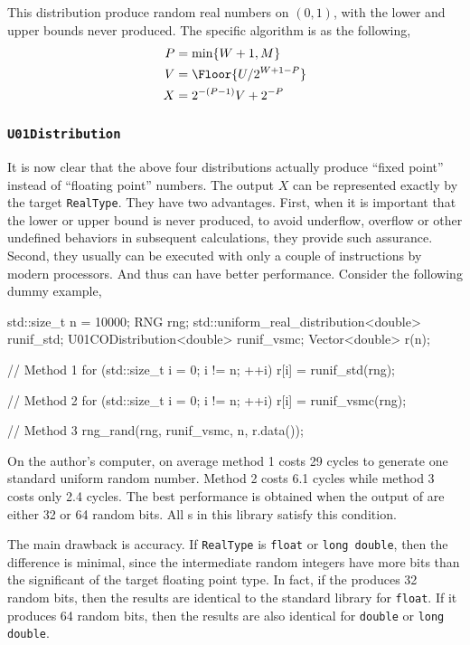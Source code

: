 This distribution produce random real numbers on $(0, 1)$, with the lower and
upper bounds never produced. The specific algorithm is as the following,
\begin{align*}
  P &= \min\{W + 1, M\} \\
  V &= \Floor{U / 2^{W + 1 - P}} \\
  X &= 2^{-(P - 1)} V + 2^{-P}
\end{align*}

\subsubsection{\texttt{U01Distribution}}

It is now clear that the above four distributions actually produce ``fixed
point'' instead of ``floating point'' numbers. The output $X$ can be
represented exactly by the target \verb|RealType|. They have two advantages.
First, when it is important that the lower or upper bound is never produced, to
avoid underflow, overflow or other undefined behaviors in subsequent
calculations, they provide such assurance. Second, they usually can be executed
with only a couple of instructions by modern processors. And thus can have
better performance. Consider the following dummy example,
\begin{cppcode}
  std::size_t n = 10000;
  RNG rng;
  std::uniform_real_distribution<double> runif_std;
  U01CODistribution<double> runif_vsmc;
  Vector<double> r(n);

  // Method 1
  for (std::size_t i = 0; i != n; ++i)
      r[i] = runif_std(rng);

  // Method 2
  for (std::size_t i = 0; i != n; ++i)
      r[i] = runif_vsmc(rng);

  // Method 3
  rng_rand(rng, runif_vsmc, n, r.data());
\end{cppcode}
On the author's computer, on average method 1 costs 29 cycles to generate one
standard uniform random number. Method 2 costs 6.1 cycles while method 3 costs
only 2.4 cycles. The best performance is obtained when the output of \rng are
either 32 or 64 random bits. All \rng{}s in this library satisfy this
condition.

The main drawback is accuracy. If \verb|RealType| is \verb|float| or
\verb|long double|, then the difference is minimal, since the intermediate
random integers have more bits than the significant of the target floating
point type. In fact, if the \rng produces 32 random bits, then the results are
identical to the standard library for \verb|float|. If it produces 64 random
bits, then the results are also identical for \verb|double| or
\verb|long double|.

